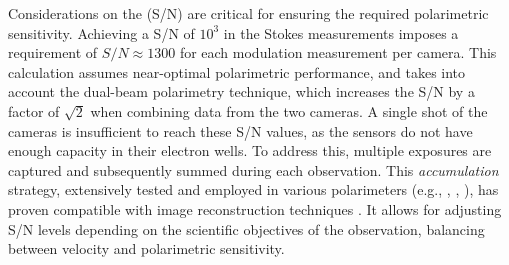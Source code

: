Considerations on the (S/N) are critical for ensuring the required polarimetric sensitivity. Achieving a S/N of $10^3$ in the Stokes measurements imposes a requirement of $S/N \approx 1300$  for each modulation measurement per camera. This calculation assumes near-optimal polarimetric performance, and takes into account the dual-beam polarimetry technique, which increases the S/N by a factor of $\sqrt{2}$ when combining data from the two cameras. A single shot of the cameras is insufficient to reach these S/N values, as the sensors do not have enough capacity in their electron wells. To address this, multiple exposures are captured and subsequently summed during each observation. This \textit{accumulation} strategy, extensively tested and employed in various polarimeters (e.g., \citealt{accs1}, \citealt{accs2}, \citealt{accs3}), has proven compatible with image reconstruction techniques \citep{accs-image1, accs-image2}. It allows for adjusting S/N levels depending on the scientific objectives of the observation, balancing between velocity and polarimetric sensitivity.

